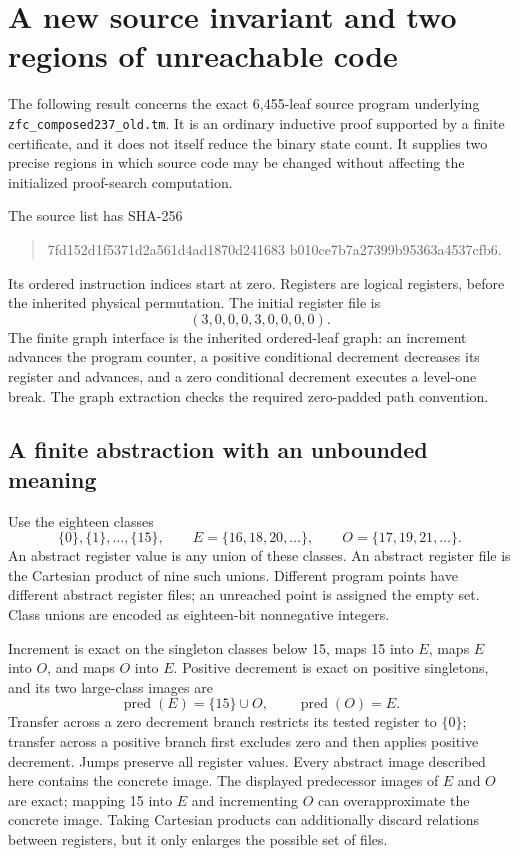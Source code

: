 \section{A new source invariant and two regions of unreachable code}
\label{sec:source-product-invariant}

The following result concerns the exact 6,455-leaf source program underlying
\texttt{zfc\_composed237\_old.tm}.  It is an ordinary inductive proof supported
by a finite certificate, and it does not itself reduce the binary state count.
It supplies two precise regions in which source code may be changed without
affecting the initialized proof-search computation.

The source list has SHA-256
\begin{quote}\small\ttfamily
7fd152d1f5371d2a561d4ad1870d241683\allowbreak
b010ce7b7a27399b95363a4537cfb6.
\end{quote}
Its ordered instruction indices start at zero.  Registers are logical
registers, before the inherited physical permutation.  The initial register
file is
\[
(3,0,0,0,3,0,0,0,0).
\]
The finite graph interface is the inherited ordered-leaf graph: an increment
advances the program counter, a positive conditional decrement decreases its
register and advances, and a zero conditional decrement executes a level-one
break.  The graph extraction checks the required zero-padded path convention.

\subsection{A finite abstraction with an unbounded meaning}

Use the eighteen classes
\[
\{0\},\{1\},\ldots,\{15\},\qquad
 E=\{16,18,20,\ldots\},\qquad
 O=\{17,19,21,\ldots\}.
\]
An abstract register value is any union of these classes.  An abstract register
file is the Cartesian product of nine such unions.  Different program points
have different abstract register files; an unreached point is assigned the
empty set.  Class unions are encoded as eighteen-bit nonnegative integers.

Increment is exact on the singleton classes below 15, maps 15 into $E$, maps
$E$ into $O$, and maps $O$ into $E$.  Positive decrement is exact on positive
singletons, and its two large-class images are
\[
\operatorname{pred}(E)=\{15\}\cup O,
\qquad
\operatorname{pred}(O)=E.
\]
Transfer across a zero decrement branch restricts its tested register to
$\{0\}$; transfer across a positive branch first excludes zero and then applies
positive decrement.  Jumps preserve all register values.  Every abstract image described here contains the concrete image.  The
displayed predecessor images of $E$ and $O$ are exact; mapping 15 into $E$
and incrementing $O$ can overapproximate the concrete image.  Taking Cartesian
products can additionally discard relations between registers, but it only
enlarges the possible set of files.

